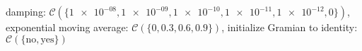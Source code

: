 damping: $\mathcal{C}(\{\num[scientific-notation=true]{1e-08},\num[scientific-notation=true]{1e-09},\num[scientific-notation=true]{1e-10},\num[scientific-notation=true]{1e-11},\num[scientific-notation=true]{1e-12},\num[scientific-notation=false]{0}\})$, exponential moving average: $\mathcal{C}(\{\num[scientific-notation=false]{0},\num[scientific-notation=true]{0.3},\num[scientific-notation=true]{0.6},\num[scientific-notation=true]{0.9}\})$, initialize Gramian to identity: $\mathcal{C}(\{\text{no},\text{yes}\})$
